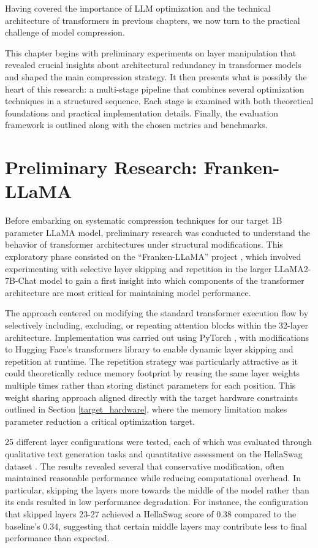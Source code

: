 Having covered the importance of LLM optimization and the technical architecture of transformers in previous chapters, we now turn to the practical challenge of model compression.

This chapter begins with preliminary experiments on layer manipulation that revealed crucial insights about architectural redundancy in transformer models and shaped the main compression strategy. It then presents what is possibly the heart of this research: a multi-stage pipeline that combines several optimization techniques in a structured sequence. Each stage is examined with both theoretical foundations and practical implementation details. Finally, the evaluation framework is outlined along with the chosen metrics and benchmarks.

\section{Preliminary Research: Franken-LLaMA} \label{frankenllama}

Before embarking on systematic compression techniques for our target 1B parameter LLaMA model, preliminary research was conducted to understand the behavior of transformer architectures under structural modifications. This exploratory phase consisted on the ``Franken-LLaMA'' project \cite{franken-llama}, which involved experimenting with selective layer skipping and repetition in the larger LLaMA2-7B-Chat model \cite{llama2} to gain a first insight into which components of the transformer architecture are most critical for maintaining model performance.

The approach centered on modifying the standard transformer execution flow by selectively including, excluding, or repeating attention blocks within the 32-layer architecture. Implementation was carried out using PyTorch \cite{pytorch}, with modifications to Hugging Face's transformers library \cite{hf_transformers} to enable dynamic layer skipping and repetition at runtime. The repetition strategy was particularly attractive as it could theoretically reduce memory footprint by reusing the same layer weights multiple times rather than storing distinct parameters for each position. This weight sharing approach aligned directly with the target hardware constraints outlined in Section \ref{target_hardware}, where the memory limitation makes parameter reduction a critical optimization target.

25 different layer configurations were tested, each of which was evaluated through qualitative text generation tasks and quantitative assessment on the HellaSwag dataset \cite{hellaswag}.
The results revealed several that conservative modification, often maintained reasonable performance while reducing computational overhead. In particular, skipping the layers more towards the middle of the model rather than its ends resulted in low performance degradation. For instance, the configuration that skipped layers 23-27 achieved a HellaSwag score of 0.38 compared to the baseline's 0.34, suggesting that certain middle layers may contribute less to final performance than expected.

